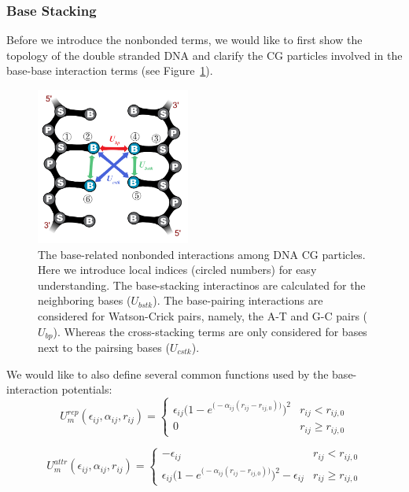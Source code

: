 \subsubsection{Base Stacking}
\label{sec:dna_3spn2c_potential_bstk}

Before we introduce the nonbonded terms, we would like to first show the
topology of the double stranded DNA and clarify the CG particles involved in the
base-base interaction terms (see Figure~\ref{fig:DNA_3spn2c_nonbonded_all}).

\begin{figure}[ht]
  \centering
  \includegraphics[width=0.45\textwidth]{figures/DNA_3spn2c_nonbonded_all.png}
  \caption{The base-related nonbonded interactions among DNA CG particles.  Here
    we introduce local indices (circled numbers) for easy understanding.  The
    base-stacking interactinos are calculated for the neighboring bases
    ($U_{bstk}$).  The base-pairing interactions are considered for Watson-Crick
    pairs, namely, the A-T and G-C pairs ($U_{bp}$).  Whereas the cross-stacking
    terms are only considered for bases next to the pairsing bases ($U_{cstk}$).}
  \label{fig:DNA_3spn2c_nonbonded_all}
\end{figure}

We would like to also define several common functions used by the
base-interaction potentials:
\begin{equation}
  \label{eq:dna_3spn2c_nonlocal_base_rep}
  U_m^{rep}(\epsilon_{ij}, \alpha_{ij}, r_{ij}) =
  \begin{cases}
    \epsilon_{ij} \Big( 1-e^{\big(-\alpha_{ij}(r_{ij}-r_{ij,0})\big)} \Big)^2 & r_{ij} < r_{ij, 0} \\[.5em]
    0 & r_{ij} \ge r_{ij, 0}
  \end{cases}
\end{equation}

\begin{equation}
  \label{eq:dna_3spn2c_nonlocal_base_attr}
  U_m^{attr}(\epsilon_{ij}, \alpha_{ij}, r_{ij}) =
  \begin{cases}
    -\epsilon_{ij} & r_{ij} < r_{ij, 0} \\[.5em]
    \epsilon_{ij} \Big(1-e^{\big(-\alpha_{ij}(r_{ij}-r_{ij,0})\big)} \Big)^2 - \epsilon_{ij} & r_{ij} \ge r_{ij, 0}
  \end{cases}
\end{equation}

